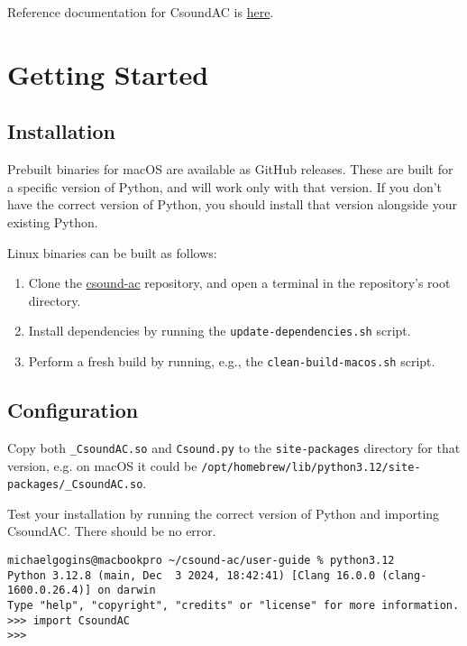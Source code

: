 \documentclass[letterpaper,10pt]{scrartcl}
\begin{document}
\noindent Reference documentation for CsoundAC is \href{https://github.com/gogins/csound-ac/blob/master/csound-ac.pdf}{here}.

\section{Getting Started}

\subsection{Installation}

Prebuilt binaries for macOS are available as GitHub releases. These are built for a specific version of Python, and will work only with that version. If you don't have the correct version of Python, you should install that version alongside your existing Python. 

Linux binaries can be built as follows:

\begin{enumerate}
\item Clone the \href{https://github.com/gogins/csound-ac}{csound-ac} repository, and open a terminal in the repository's root directory.
\item Install dependencies by running the \texttt{update-dependencies.sh} script.
\item Perform a fresh build by running, e.g., the \texttt{clean-build-macos.sh} script.
\end{enumerate}

\subsection{Configuration}

Copy both \texttt{\_CsoundAC.so} and \texttt{Csound.py} to the \texttt{site-packages} directory for that version, e.g. on macOS it could be \lstinline|/opt/homebrew/lib/python3.12/site-packages/_CsoundAC.so|.

Test your installation by running the correct version of Python and importing CsoundAC. There should be no error.

\begin{lstlisting}
michaelgogins@macbookpro ~/csound-ac/user-guide % python3.12
Python 3.12.8 (main, Dec  3 2024, 18:42:41) [Clang 16.0.0 (clang-1600.0.26.4)] on darwin
Type "help", "copyright", "credits" or "license" for more information.
>>> import CsoundAC
>>> 
\end{lstlisting}
\end{document}
